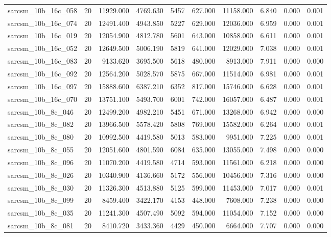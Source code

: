 \begin{tabular}{lrrrrrrrrr}
sarcsm\_10b\_16c\_058 & 20 & 11929.000 & 4769.630 & 5457 & 627.000 & 11158.000 & 6.840 & 0.000 & 0.001 \\
sarcsm\_10b\_16c\_074 & 20 & 12491.400 & 4943.850 & 5227 & 629.000 & 12036.000 & 6.959 & 0.000 & 0.001 \\
sarcsm\_10b\_16c\_019 & 20 & 12054.900 & 4812.780 & 5601 & 643.000 & 10858.000 & 6.611 & 0.000 & 0.001 \\
sarcsm\_10b\_16c\_052 & 20 & 12649.500 & 5006.190 & 5819 & 641.000 & 12029.000 & 7.038 & 0.000 & 0.001 \\
sarcsm\_10b\_16c\_083 & 20 & 9133.620 & 3695.500 & 5618 & 480.000 & 8913.000 & 7.911 & 0.000 & 0.000 \\
sarcsm\_10b\_16c\_092 & 20 & 12564.200 & 5028.570 & 5875 & 667.000 & 11514.000 & 6.981 & 0.000 & 0.001 \\
sarcsm\_10b\_16c\_097 & 20 & 15888.600 & 6387.210 & 6352 & 817.000 & 15746.000 & 6.628 & 0.000 & 0.001 \\
sarcsm\_10b\_16c\_070 & 20 & 13751.100 & 5493.700 & 6001 & 742.000 & 16057.000 & 6.487 & 0.000 & 0.001 \\
sarcsm\_10b\_8c\_046 & 20 & 12499.200 & 4982.210 & 5451 & 671.000 & 13268.000 & 6.942 & 0.000 & 0.000 \\
sarcsm\_10b\_8c\_082 & 20 & 13966.500 & 5578.420 & 5808 & 769.000 & 15582.000 & 6.264 & 0.000 & 0.001 \\
sarcsm\_10b\_8c\_080 & 20 & 10992.500 & 4419.580 & 5013 & 583.000 & 9951.000 & 7.225 & 0.000 & 0.001 \\
sarcsm\_10b\_8c\_055 & 20 & 12051.600 & 4801.590 & 6084 & 635.000 & 13055.000 & 7.498 & 0.000 & 0.000 \\
sarcsm\_10b\_8c\_096 & 20 & 11070.200 & 4419.580 & 4714 & 593.000 & 11561.000 & 6.218 & 0.000 & 0.000 \\
sarcsm\_10b\_8c\_026 & 20 & 10340.900 & 4136.660 & 5172 & 556.000 & 10456.000 & 7.316 & 0.000 & 0.000 \\
sarcsm\_10b\_8c\_030 & 20 & 11326.300 & 4513.880 & 5125 & 599.000 & 11453.000 & 7.017 & 0.000 & 0.001 \\
sarcsm\_10b\_8c\_099 & 20 & 8459.400 & 3422.170 & 4153 & 448.000 & 7608.000 & 7.238 & 0.000 & 0.000 \\
sarcsm\_10b\_8c\_035 & 20 & 11241.300 & 4507.490 & 5092 & 594.000 & 11054.000 & 7.152 & 0.000 & 0.000 \\
sarcsm\_10b\_8c\_081 & 20 & 8410.720 & 3433.360 & 4429 & 450.000 & 6664.000 & 7.707 & 0.000 & 0.000 \\

\end{tabular}
